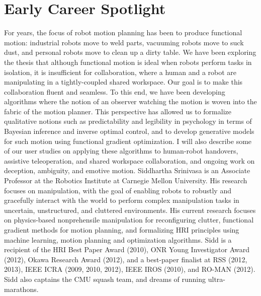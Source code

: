 \chapter{Early Career Spotlight}

{
For years, the focus of robot motion planning has been to produce functional motion: industrial robots move to weld parts, vacuuming robots move to suck dust, and personal robots move to clean up a dirty table. We have been exploring the thesis that although functional motion is ideal when robots perform tasks in isolation, it is insufficient for collaboration, where a human and a robot are manipulating in a tightly-coupled shared workspace. Our goal is to make this collaboration fluent and seamless. To this end, we have been developing algorithms where the notion of an observer watching the motion is woven into the fabric of the motion planner. This perspective has allowed us to formalize qualitative notions such as predictability and legibility in psychology in terms of Bayesian inference and inverse optimal control, and to develop generative models for such motion using functional gradient optimization. I will also describe some of our user studies on applying these algorithms to human-robot handovers, 
assistive teleoperation, and shared workspace collaboration, and ongoing work on deception, ambiguity, and emotive motion.
}{
Siddhartha Srinivasa is an Associate Professor at the Robotics Institute at Carnegie Mellon University. His research focuses on manipulation, with the goal of enabling robots to robustly and gracefully interact with the world to perform complex manipulation tasks in uncertain, unstructured, and cluttered environments. His current research focuses on physics-based nonprehensile manipulation for reconfiguring clutter, functional gradient methods for motion planning, and formalizing HRI principles using machine learning, motion planning and optimization algorithms. Sidd is a recipient of the HRI Best Paper Award (2010), ONR Young Investigator Award (2012), Okawa Research Award (2012), and a best-paper finalist at RSS (2012, 2013), IEEE ICRA (2009, 2010, 2012), IEEE IROS (2010), and RO-MAN (2012). Sidd also captains the CMU squash team, and dreams of running ultra-marathons.
}


